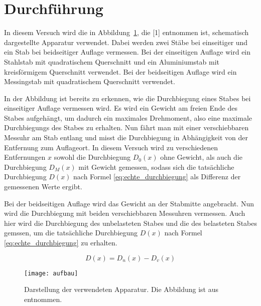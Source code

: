 \section{Durchführung}
In diesem Versuch wird die in Abbildung~\ref{fig:aufbau}, die
[1] entnommen ist, schematisch dargestellte Apparatur
verwendet.  Dabei werden zwei Stäbe bei einseitiger und ein Stab bei
beidseitiger Auflage vermessen.  Bei der einseitigen Auflage wird ein
Stahlstab mit quadratischem Querschnitt und ein Aluminiumstab mit
kreisförmigem Querschnitt verwendet. Bei der beidseitigen Auflage wird
ein Messingstab mit quadratischem Querschnitt verwendet.

In der Abbildung ist bereits zu erkennen, wie die Durchbiegung eines
Stabes bei einseitiger Auflage vermessen wird. Es wird ein Gewicht am
freien Ende des Stabes aufgehängt, um dadurch ein maximales Drehmoment,
also eine maximale Durchbiegungs des Stabes zu erhalten. Nun fährt man
mit einer verschiebbaren Messuhr am Stab entlang und misst die
Durchbiegung in Abhängigkeit von der Entfernung zum Auflageort. In
diesem Versuch wird zu verschiedenen Entfernungen $x$ sowohl die
Durchbiegung $D_0(x)$ ohne Gewicht, als auch die Durchbiegung $D_M(x)$
mit Gewicht gemessen, sodass sich die tatsächliche Durchbiegung $D(x)$
nach Formel \eqref{eq:echte_durchbiegung} als Differenz der gemessenen
Werte ergibt.

Bei der beidseitigen Auflage wird das Gewicht an der Stabmitte
angebracht. Nun wird die Durchbiegung mit beiden verschiebbaren
Messuhren vermessen. Auch hier wird die Durchbiegung des unbelasteten
Stabes und die des belasteten Stabes gemssen, um die tatsächliche
Durchbiegung $D(x)$ nach Formel \eqref{eq:echte_durchbiegung} zu
erhalten.

\begin{equation}
\label{eq:echte_durchbiegung}
D(x) = D_n(x) - D_v(x)
\end{equation}

\begin{figure}
\centering
\texttt{[image: aufbau]}
\caption{Darstellung der verwendeten Apparatur. Die Abbildung ist aus
  \textcite{v103} entnommen.}
\label{fig:aufbau}
\end{figure} 
